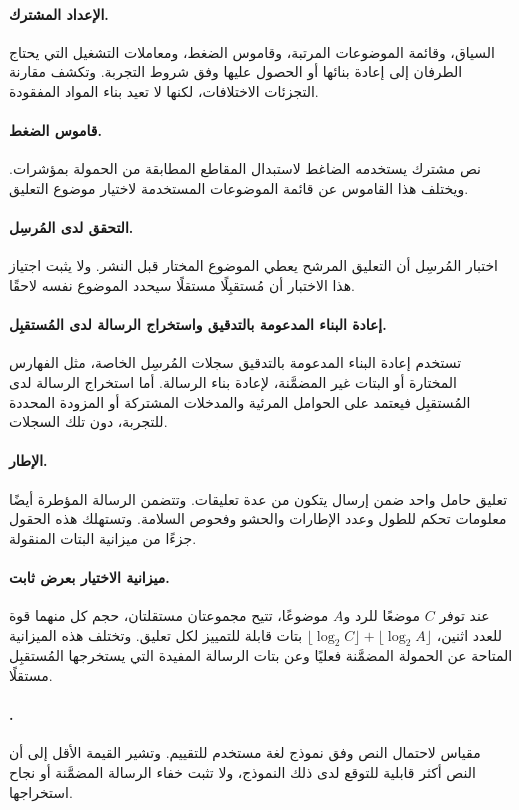 \paragraph{الإعداد المشترك.}
السياق، وقائمة الموضوعات المرتبة، وقاموس الضغط، ومعاملات التشغيل التي يحتاج الطرفان إلى إعادة بنائها أو الحصول عليها وفق شروط التجربة. وتكشف مقارنة التجزئات الاختلافات، لكنها لا تعيد بناء المواد المفقودة.

\paragraph{قاموس الضغط.}
نص مشترك يستخدمه الضاغط لاستبدال المقاطع المطابقة من الحمولة بمؤشرات. ويختلف هذا القاموس عن قائمة الموضوعات المستخدمة لاختيار موضوع التعليق.

\paragraph{التحقق لدى المُرسِل.}
اختبار المُرسِل أن التعليق المرشح يعطي الموضوع المختار قبل النشر. ولا يثبت اجتياز هذا الاختبار أن مُستقبِلًا مستقلًا سيحدد الموضوع نفسه لاحقًا.

\paragraph{إعادة البناء المدعومة بالتدقيق واستخراج الرسالة لدى المُستقبِل.}
تستخدم إعادة البناء المدعومة بالتدقيق سجلات المُرسِل الخاصة، مثل الفهارس المختارة أو البتات غير المضمَّنة، لإعادة بناء الرسالة. أما استخراج الرسالة لدى المُستقبِل فيعتمد على الحوامل المرئية والمدخلات المشتركة أو المزودة المحددة للتجربة، دون تلك السجلات.

\paragraph{الإطار.}
تعليق حامل واحد ضمن إرسال يتكون من عدة تعليقات. وتتضمن الرسالة المؤطرة أيضًا معلومات تحكم للطول وعدد الإطارات والحشو وفحوص السلامة. وتستهلك هذه الحقول جزءًا من ميزانية البتات المنقولة.

\paragraph{ميزانية الاختيار بعرض ثابت.}
عند توفر $C$ موضعًا للرد و$A$ موضوعًا، تتيح مجموعتان مستقلتان، حجم كل منهما قوة للعدد اثنين، $\lfloor\log_2 C\rfloor+\lfloor\log_2 A\rfloor$ بتات قابلة للتمييز لكل تعليق. وتختلف هذه الميزانية المتاحة عن الحمولة المضمَّنة فعليًا وعن بتات الرسالة المفيدة التي يستخرجها المُستقبِل مستقلًا.

\paragraph{.}
مقياس لاحتمال النص وفق نموذج لغة مستخدم للتقييم. وتشير القيمة الأقل إلى أن النص أكثر قابلية للتوقع لدى ذلك النموذج، ولا تثبت خفاء الرسالة المضمَّنة أو نجاح استخراجها.

